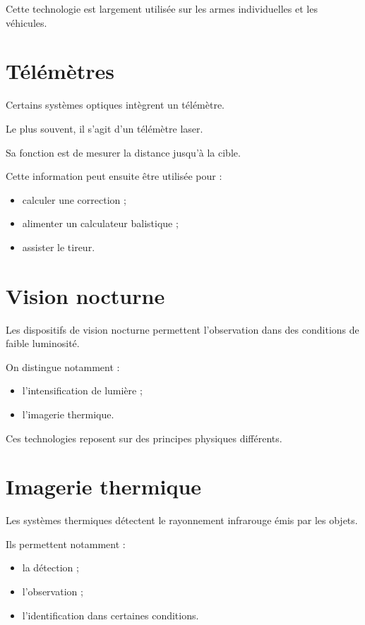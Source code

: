 Cette technologie est largement utilisée sur les armes individuelles et les
véhicules.

\section{Télémètres}

Certains systèmes optiques intègrent un télémètre.

Le plus souvent, il s'agit d'un télémètre laser.

Sa fonction est de mesurer la distance jusqu'à la cible.

Cette information peut ensuite être utilisée pour :

\begin{itemize}
    \item calculer une correction ;
    \item alimenter un calculateur balistique ;
    \item assister le tireur.
\end{itemize}

\section{Vision nocturne}

Les dispositifs de vision nocturne permettent l'observation dans des
conditions de faible luminosité.

On distingue notamment :

\begin{itemize}
    \item l'intensification de lumière ;
    \item l'imagerie thermique.
\end{itemize}

Ces technologies reposent sur des principes physiques différents.

\section{Imagerie thermique}

Les systèmes thermiques détectent le rayonnement infrarouge émis par les
objets.

Ils permettent notamment :

\begin{itemize}
    \item la détection ;
    \item l'observation ;
    \item l'identification dans certaines conditions.
\end{itemize}

